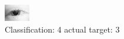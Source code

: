 \begin{figure}[h!]
\begin{center}
\includegraphics[width=0.60\columnwidth]{figures/ID31_class_4_target_3.png}
\end{center}
\caption{ Classification: 4 actual target: 3}
\label{fig:ID31_class_4_target_3}
\end{figure}
